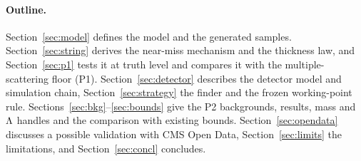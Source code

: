 \paragraph{Outline.} Section~\ref{sec:model} defines the model and the generated samples. Section~\ref{sec:string}
derives the near-miss mechanism and the thickness law, and Section~\ref{sec:p1} tests it at truth level and compares it
with the multiple-scattering floor (P1). Section~\ref{sec:detector} describes the detector model and simulation chain,
Section~\ref{sec:strategy} the finder and the frozen working-point rule. Sections~\ref{sec:bkg}--\ref{sec:bounds} give
the P2 backgrounds, results, mass and $\Lambda$ handles and the comparison with existing bounds. Section~\ref{sec:opendata}
discusses a possible validation with CMS Open Data, Section~\ref{sec:limits} the limitations, and
Section~\ref{sec:concl} concludes.
